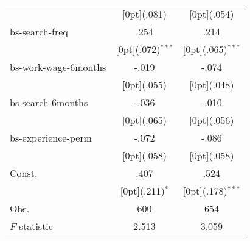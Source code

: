 \begin{tabular*}{\textwidth}{@{\extracolsep{\fill}}lcc}
&	\raisebox{.7ex}[0pt]{\scriptsize (.081)} &	\raisebox{.7ex}[0pt]{\scriptsize (.054)} \\
bs-search-freq &	.254 &	.214 \\
&	\raisebox{.7ex}[0pt]{\scriptsize (.072)$^{***}$} &	\raisebox{.7ex}[0pt]{\scriptsize (.065)$^{***}$} \\
bs-work-wage-6months &	-.019 &	-.074 \\
&	\raisebox{.7ex}[0pt]{\scriptsize (.055)} &	\raisebox{.7ex}[0pt]{\scriptsize (.048)} \\
bs-search-6months &	-.036 &	-.010 \\
&	\raisebox{.7ex}[0pt]{\scriptsize (.065)} &	\raisebox{.7ex}[0pt]{\scriptsize (.056)} \\
bs-experience-perm &	-.072 &	-.086 \\
&	\raisebox{.7ex}[0pt]{\scriptsize (.058)} &	\raisebox{.7ex}[0pt]{\scriptsize (.058)} \\
Const. &	.407 &	.524 \\
&	\raisebox{.7ex}[0pt]{\scriptsize (.211)$^{*}$} &	\raisebox{.7ex}[0pt]{\scriptsize (.178)$^{***}$} \\
Obs. &	600 &	654 \\
$ F$ statistic &	2.513 &	3.059 \\
\hline\hline		
\end{tabular*}%
